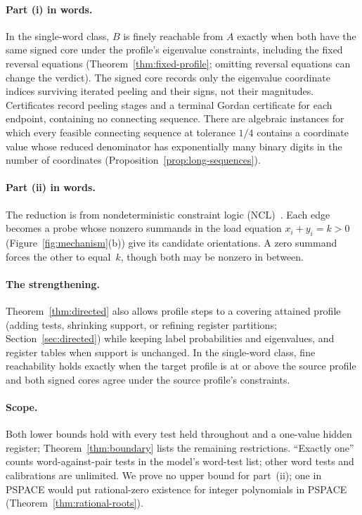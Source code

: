 \paragraph{Part (i) in words.} In the single-word class, $B$ is finely
reachable from $A$ exactly when both have the same signed core under the
profile's eigenvalue constraints, including the fixed reversal equations
(Theorem~\ref{thm:fixed-profile}; omitting reversal equations can change the
verdict).
The signed core records only the eigenvalue coordinate indices surviving
iterated peeling and their signs, not their magnitudes.
Certificates record peeling stages and a terminal Gordan certificate for each
endpoint, containing no connecting sequence. %
There are algebraic instances for which every feasible connecting sequence
at tolerance $1/4$ contains a coordinate value whose reduced denominator has
exponentially many binary digits in the number of coordinates
(Proposition~\ref{prop:long-sequences}).

\paragraph{Part (ii) in words.} The reduction is from nondeterministic
constraint logic (NCL)~\cite{hearndemaine}. Each edge becomes a probe whose
nonzero summands in the load equation $x_i+y_i=k>0$
(Figure~\ref{fig:mechanism}(b)) give its candidate orientations. A zero
summand forces the other to equal~$k$, though both may be nonzero in between.

\paragraph{The strengthening.} Theorem~\ref{thm:directed} also allows
profile steps to a covering attained profile (adding tests, shrinking
support, or refining register partitions; Section~\ref{sec:directed}) while
keeping label probabilities and eigenvalues, and register tables when support
is unchanged. In the single-word class, fine reachability holds exactly when
the target profile is at or above the source profile and both signed cores
agree under the source profile's constraints.

\paragraph{Scope.} Both lower bounds hold with every test held throughout
and a one-value hidden register; Theorem~\ref{thm:boundary} lists the
remaining restrictions.
``Exactly one'' counts word-against-pair tests in the model's word-test list;
other word tests and calibrations are unlimited. We prove no upper bound for
part~(ii); one in PSPACE would put rational-zero existence for integer
polynomials in PSPACE (Theorem~\ref{thm:rational-roots}).

